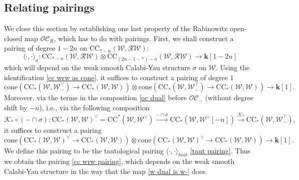 \documentclass[11pt]{amsproc}
\def\K{{\mathbf{k}}}
\def\w{\mathcal{W}(E)}
\def\oc{\mathcal{OC}}
\def\r#1{\mathrm{#1}}
\def\w{\mathcal{W}}
\def\rw{\mathcal{RW}}
\def\cone{\mathrm{cone}}
\theoremstyle{remark}
\numberwithin{equation}{section}
\begin{document}
\subsection{Relating pairings}\label{section: relating pairings}

We close this section by establishing one last property of the Rabinowitz open-closed map $\oc_{R}$,
which has to do with pairings.
First, we shall construct a pairing of degree $1-2n$ on $\r{CC}_{*-n}(\w, \rw)$:
\begin{equation}\label{cc wrw pairing}
\langle \cdot, \cdot \rangle_{\sigma}: \r{CC}_{*-n}(\w, \rw) \otimes \r{CC}_{(2n-1-*)-n}(\w, \rw) \to \K[1-2n]
\end{equation}
which will depend on the weak smooth Calabi-Yau structure $\sigma$ on $\w$.
Using the identification \eqref{cc wrw as cone},
it suffices to construct a pairing of degree $1$
\begin{equation}\label{cc wrw pairing 1}
\cone(\r{CC}_{*}(\w, \w_{-}^{\top}) \to \r{CC}_{*}(\w, \w)) \otimes \cone(\r{CC}_{*}(\w, \w_{-}^{\top}) \to \r{CC}_{*}(\w, \w)) \to \K[1].
\end{equation}
Moreover, via the terms in the composition \eqref{oc dual} before $\oc_{-}$ (without degree shift by $-n$), 
i.e., via the following composition
\begin{equation}\label{w dual is w-}
\mathcal{K}_{*} \circ (-\cap \sigma): \r{CC}_{*}(\w, \w)^{\vee} = \r{CC}^{*}(\w, \w^{\vee}) \stackrel{-\cap \sigma}\to \r{CC}_{*}(\w, \w^{\vee}[-n]) \stackrel{\mathcal{K}_{*}}\to \r{CC}_{*}(\w, \w_{-}^{\top}),
\end{equation}
it suffices to construct a pairing
\begin{equation}\label{cc wrw pairing 2}
\cone(\r{CC}_{*}(\w, \w)^{\vee} \to \r{CC}_{*}(\w, \w)) \otimes \cone(\r{CC}_{*}(\w, \w)^{\vee} \to \r{CC}_{*}(\w, \w)) \to \K[1].
\end{equation}
We define this pairing to be the tautological pairing $\langle \cdot, \cdot \rangle_{taut}$ \eqref{taut pairing}.
Thus we obtain the pairing \eqref{cc wrw pairing}, 
which depends on the weak smooth Calabi-Yau structure in the way that the map \eqref{w dual is w-} does.
\end{document}
